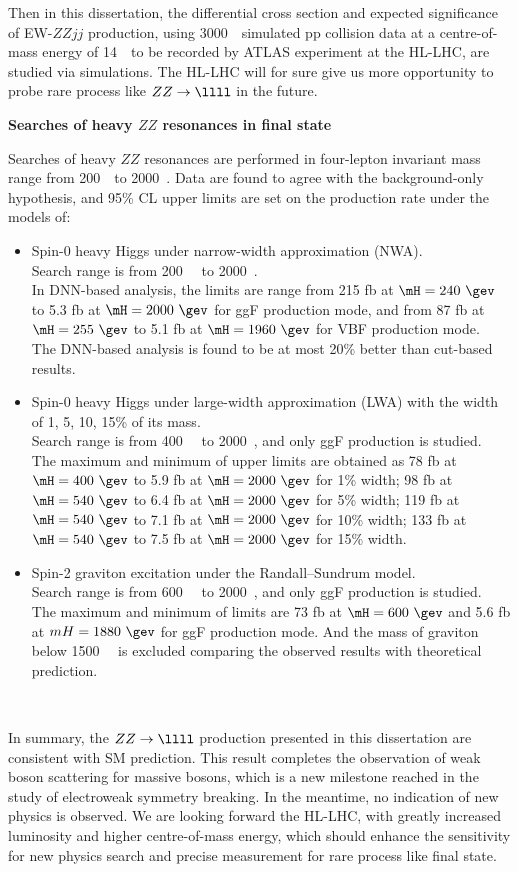 Then in this dissertation, the differential cross section and expected significance of EW-$ZZjj$ production, 
using 3000~\ifb~simulated pp collision data at a centre-of-mass energy of 14~\tev~to be recorded by ATLAS experiment at the HL-LHC,
are studied via simulations.
The HL-LHC will for sure give us more opportunity to probe rare process like $ZZ \rightarrow \llll$ in the future.

\textbf{Searches of heavy $ZZ$ resonances in \llll final state}

Searches of heavy $ZZ$ resonances are performed in four-lepton invariant mass \mfl range from 200~\gev~to 2000~\gev.
Data are found to agree with the background-only hypothesis, and 95\% CL upper limits are set on the production rate under the models of:
\begin{itemize}
	\item Spin-0 heavy Higgs under narrow-width approximation (NWA). \\
Search range is from 200~\gev~ to 2000~\gev.\\
In DNN-based analysis, the limits are range from 215 fb at $\mH = 240~\gev$ to 5.3 fb at $\mH = 2000~\gev$ for ggF production mode,
and from 87 fb at $\mH = 255~\gev$ to 5.1 fb at $\mH = 1960~\gev$ for VBF production mode.\\
The DNN-based analysis is found to be at most 20\% better than cut-based results.
	\item Spin-0 heavy Higgs under large-width approximation (LWA) with the width of 1, 5, 10, 15\% of its mass.\\
Search range is from 400~\gev~ to 2000~\gev, and only ggF production is studied.\\
The maximum and minimum of upper limits are obtained as 78 fb at $\mH = 400~\gev$ to 5.9 fb at $\mH = 2000~\gev$ for 1\% width;
98 fb at $\mH = 540~\gev$ to 6.4 fb at $\mH = 2000~\gev$ for 5\% width;
119 fb at $\mH = 540~\gev$ to 7.1 fb at $\mH = 2000~\gev$ for 10\% width;
133 fb at $\mH = 540~\gev$ to 7.5 fb at $\mH = 2000~\gev$ for 15\% width.
	\item Spin-2 graviton excitation under the Randall–Sundrum model.\\
Search range is from 600~\gev~ to 2000~\gev, and only ggF production is studied.\\
The maximum and minimum of limits are 73 fb at $\mH = 600~\gev$ and 5.6 fb at $mH = 1880~\gev$ for ggF production mode.
And the mass of graviton below 1500~\gev~ is excluded comparing the observed results with theoretical prediction.
\end{itemize}
~~

In summary, the $ZZ \rightarrow \llll$ production presented in this dissertation are consistent with SM prediction.
This result completes the observation of weak boson scattering for massive bosons, 
which is a new milestone reached in the study of electroweak symmetry breaking.
In the meantime, no indication of new physics is observed.
We are looking forward the HL-LHC, with greatly increased luminosity and higher centre-of-mass energy, 
which should enhance the sensitivity for new physics search and precise measurement for rare process like \llll final state.
